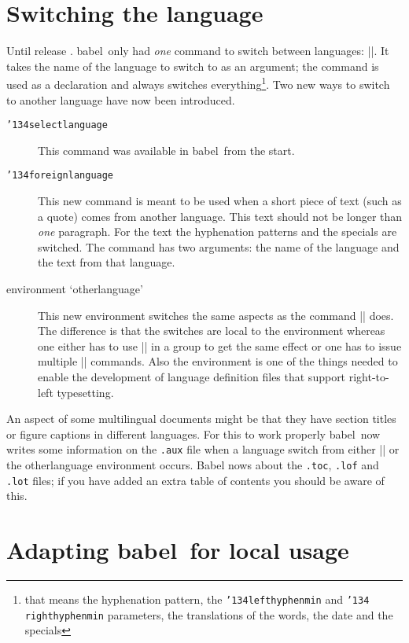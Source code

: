 \documentclass{ltugboat}
\newcommand*{\file}[1]{\texttt{#1}}
\newcommand*{\Lenv}[1]{\textsf{#1}}
\newcommand*\babel{\textsf{babel}}
\newcommand*\bs{\char'134}
\let\osn\oldstylenums
\begin{document}
\section{Switching the language}

Until release \osn{3}.\osn{5} \babel\ only had \emph{one} command to
switch between languages: |\selectlanguage|. It takes the name of the
language to switch to as an argument; the command is used as a
declaration and always switches everything\footnote{that means the
  hyphenation pattern, the \texttt{\bs lefthyphenmin} and \texttt{\bs
    righthyphenmin} parameters, the translations of the words, the
  date and the specials}. Two new ways to switch to another language
have now been introduced.

\begin{description}
\item[\texttt{\bs selectlanguage}] This command was available in
  \babel\ from the start.
\item[\texttt{\bs foreignlanguage}] This new command is meant to be
  used when a short piece of text (such as a quote) comes from another
  language. This text should not be longer than \emph{one} paragraph.
  For the text the hyphenation patterns and the specials are switched.
  The command has two arguments: the name of the language and the text
  from that language.
\item[environment `otherlanguage'] This new environment switches the
  same aspects as the command |\selectlanguage| does. The difference
  is that the switches are local to the environment whereas one either
  has to use |\selectlanguage| in a group to get the same effect or
  one has to issue multiple |\selectlanguage| commands. Also the
  environment is one of the things needed to enable the development of
  language definition files that support right-to-left typesetting.
\end{description}

An aspect of some multilingual documents might be that they have
section titles or figure captions in different languages. For this to
work properly \babel\ now writes some information on the \file{.aux}
file when a language switch from either |\selectlanguage| or the
\Lenv{otherlanguage} environment occurs.  \textsf{Babel} nows about
the \file{.toc}, \file{.lof} and \file{.lot} files; if you have added
an extra table of contents you should be aware of this.
  
\section{Adapting \babel\ for local usage}
\end{document}
